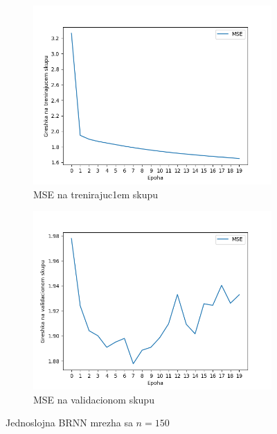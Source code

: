 \documentclass[a4paper, openany, oneside, 11pt]{book}
\begin{document}
\begin{figure}[!h]
        \centering
        \begin{subfigure}{0.475\textwidth}
            \centering
            \includegraphics[scale=0.45]{res/SL_BLSTM_150units_d00_train.png}
            \caption{\acrshort{MSE} na trenirajuc1em skupu}
            \label{fig:4_10a}
            \vspace{0pt}
        \end{subfigure}%
        \begin{subfigure}{0.475\textwidth}
            \centering
            \includegraphics[scale=0.45]{res/SL_BLSTM_150units_d00_validation.png}
            \caption{\acrshort{MSE} na validacionom skupu}
            \label{fig:4_10b}
            \vspace{0pt}
        \end{subfigure}
        \caption{Jednoslojna \acrshort{BRNN} mrezha sa $n=150$}
        \label{fig:4_10}
\end{figure}
\end{document}
